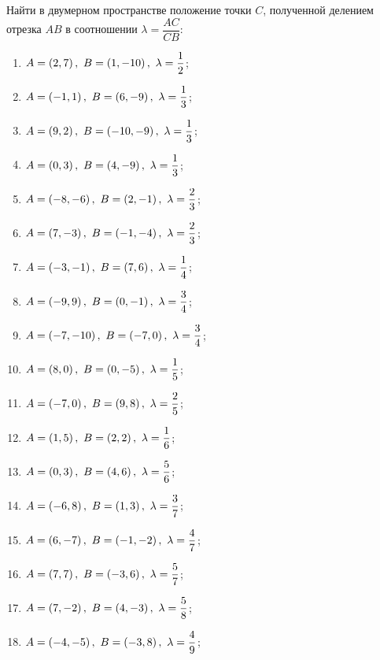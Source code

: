 	\vspace{15pt}
	Найти в двумерном пространстве положение точки $C$, полученной делением отрезка $AB$ в соотношении $\lambda = \dfrac{AC}{CB}$:

	\begin{enumerate}
		\setcounter{enumi}{\value{tasks}}

		\item \( \displaystyle A = \left( 2, 7 \right), ~ B = \left( 1, -10 \right), ~ \lambda = \frac{1}{2} \);
		\item \( \displaystyle A = \left( -1, 1 \right), ~ B = \left( 6, -9 \right), ~ \lambda = \frac{1}{3} \);
		\item \( \displaystyle A = \left( 9, 2 \right), ~ B = \left( -10, -9 \right), ~ \lambda = \frac{1}{3} \);
		\item \( \displaystyle A = \left( 0, 3 \right), ~ B = \left( 4, -9 \right), ~ \lambda = \frac{1}{3} \);
		\item \( \displaystyle A = \left( -8, -6 \right), ~ B = \left( 2, -1 \right), ~ \lambda = \frac{2}{3} \);
		\item \( \displaystyle A = \left( 7, -3 \right), ~ B = \left( -1, -4 \right), ~ \lambda = \frac{2}{3} \);
		\item \( \displaystyle A = \left( -3, -1 \right), ~ B = \left( 7, 6 \right), ~ \lambda = \frac{1}{4} \);
		\item \( \displaystyle A = \left( -9, 9 \right), ~ B = \left( 0, -1 \right), ~ \lambda = \frac{3}{4} \);
		\item \( \displaystyle A = \left( -7, -10 \right), ~ B = \left( -7, 0 \right), ~ \lambda = \frac{3}{4} \);
		\item \( \displaystyle A = \left( 8, 0 \right), ~ B = \left( 0, -5 \right), ~ \lambda = \frac{1}{5} \);
		\item \( \displaystyle A = \left( -7, 0 \right), ~ B = \left( 9, 8 \right), ~ \lambda = \frac{2}{5} \);
		\item \( \displaystyle A = \left( 1, 5 \right), ~ B = \left( 2, 2 \right), ~ \lambda = \frac{1}{6} \);
		\item \( \displaystyle A = \left( 0, 3 \right), ~ B = \left( 4, 6 \right), ~ \lambda = \frac{5}{6} \);
		\item \( \displaystyle A = \left( -6, 8 \right), ~ B = \left( 1, 3 \right), ~ \lambda = \frac{3}{7} \);
		\item \( \displaystyle A = \left( 6, -7 \right), ~ B = \left( -1, -2 \right), ~ \lambda = \frac{4}{7} \);
		\item \( \displaystyle A = \left( 7, 7 \right), ~ B = \left( -3, 6 \right), ~ \lambda = \frac{5}{7} \);
		\item \( \displaystyle A = \left( 7, -2 \right), ~ B = \left( 4, -3 \right), ~ \lambda = \frac{5}{8} \);
		\item \( \displaystyle A = \left( -4, -5 \right), ~ B = \left( -3, 8 \right), ~ \lambda = \frac{4}{9} \);

		\setcounter{tasks}{\value{enumi}}
	\end{enumerate}

